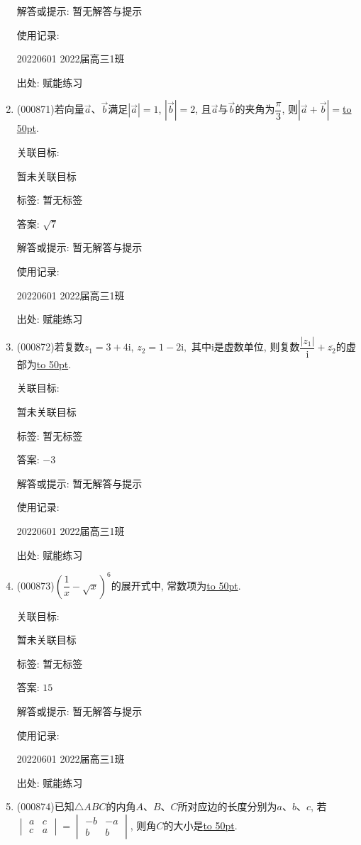 \documentclass[10pt,a4paper]{article}
\newcommand{\blank}[1]{\underline{\hbox to #1pt{}}}
\begin{document}
\begin{enumerate}[1.]
解答或提示: 暂无解答与提示

使用记录:

20220601	2022届高三1班	


出处: 赋能练习
\item { (000871)}若向量$\overrightarrow a$、$\overrightarrow b$满足$|\overrightarrow a|=1$, $|\overrightarrow b|=2$, 且$\overrightarrow a$与$\overrightarrow b$的夹角为$\dfrac{\pi}3$, 则$|\overrightarrow a+\overrightarrow b|=$\blank{50}.


关联目标:

暂未关联目标



标签: 暂无标签

答案: $\sqrt 7$

解答或提示: 暂无解答与提示

使用记录:

20220601	2022届高三1班	


出处: 赋能练习
\item { (000872)}若复数$z_1=3+4\mathrm{i}$, $z_2=1-2\mathrm{i},$ 其中$\mathrm{i}$是虚数单位, 则复数$\dfrac{|z_1|}{\mathrm{i}}+\overline{z_2}$的虚部为\blank{50}.


关联目标:

暂未关联目标



标签: 暂无标签

答案: $-3$

解答或提示: 暂无解答与提示

使用记录:

20220601	2022届高三1班	


出处: 赋能练习
\item { (000873)}$(\dfrac1x-\sqrt x)^6$的展开式中, 常数项为\blank{50}.


关联目标:

暂未关联目标



标签: 暂无标签

答案: $15$

解答或提示: 暂无解答与提示

使用记录:

20220601	2022届高三1班	


出处: 赋能练习
\item { (000874)}已知$\triangle  ABC$的内角$A$、$B$、$C$所对应边的长度分别为$a$、$b$、$c$, 若$\begin{vmatrix}a & c \\ c & a\end{vmatrix} = \begin{vmatrix}-b & -a \\ b & b\end{vmatrix}$, 则角$C$的大小是\blank{50}.



\end{enumerate}
\end{document}
